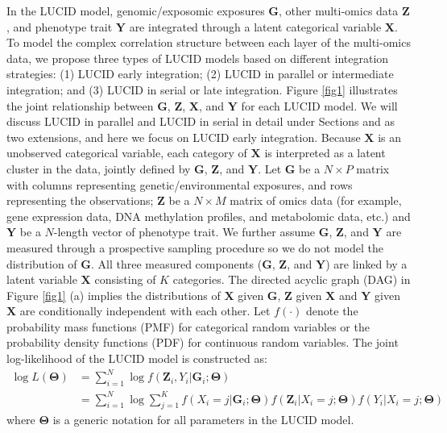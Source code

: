 In the LUCID model, genomic/exposomic exposures $\bm G$, other multi-omics data $\bm Z$, and phenotype trait $\bm Y$ are integrated through a latent categorical variable $\bm X$. To model the complex correlation structure between each layer of the multi-omics data, we propose three types of LUCID models based on different integration strategies: (1) LUCID early integration; (2) LUCID in parallel or intermediate integration; and (3) LUCID in serial or late integration. Figure \ref{fig1} illustrates the joint relationship between $\bm G$, $\bm Z$, $\bm X$, and $\bm Y$ for each LUCID model. We will discuss LUCID in parallel and LUCID in serial in detail under Sections  and  as two extensions, and here we focus on LUCID early integration. Because $\bm X$ is an unobserved categorical variable, each category of $\bm X$ is interpreted as a latent cluster in the data, jointly defined by $\bm G$, $\bm Z$, and $\bm Y$. Let $\bm G$ be a $N \times P$ matrix with columns representing genetic/environmental exposures, and rows representing the observations; $\bm Z$ be a $N \times M$ matrix of omics data (for example, gene expression data, DNA methylation profiles, and metabolomic data, etc.) and $\bm Y$ be a $N$-length vector of phenotype trait. We further assume $\bm G$, $\bm Z$, and $\bm Y$ are measured through a prospective sampling procedure so we do not model the distribution of $\bm G$. All three measured components ($\bm G$, $\bm Z$, and $\bm Y$) are linked by a latent variable $\bm X$ consisting of $K$ categories. The directed acyclic graph (DAG) in Figure \ref{fig1} (a) implies the distributions of $\bm X$ given $\bm G$, $\bm Z$ given $\bm X$ and $\bm Y$ given $\bm X$ are conditionally independent with each other. Let $f(\cdot)$ denote the probability mass functions (PMF) for categorical random variables or the probability density functions (PDF) for continuous random variables. The joint log-likelihood of the LUCID model is constructed as:
\begin{equation}
    \begin{aligned}
         \log L(\bm{\Theta}) & = \sum_{i = 1}^N \log f(\bm{Z}_i, Y_i|\bm{G}_i;\bm{\Theta}) \\
         & = \sum_{i = 1}^N \log \sum_{j = 1}^K f(X_i = j| \bm{G}_i; \bm{\Theta}) f(\bm{Z}_i| X_i = j; \bm{\Theta}) f(Y_i|X_i = j; \bm{\Theta})
    \end{aligned}
    \label{eq1}
\end{equation}
where $\bm \Theta$ is a generic notation for all parameters in the LUCID model.
